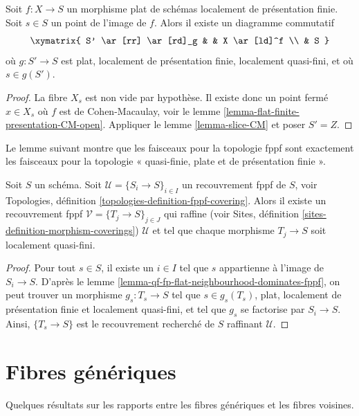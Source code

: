 \begin{lemma}
\label{lemma-qf-fp-flat-neighbourhood-dominates-fppf}
Soit $f : X \to S$ un morphisme plat de schémas
localement de présentation finie. Soit $s \in S$ un point de l'image de $f$.
Alors il existe un diagramme commutatif
$$
\xymatrix{
S' \ar[rr] \ar[rd]_g & & X \ar[ld]^f \\
& S
}
$$
où $g : S' \to S$ est plat, localement de présentation finie,
localement quasi-fini, et où $s \in g(S')$.
\end{lemma}

\begin{proof}
La fibre $X_s$ est non vide par hypothèse. Il existe donc un point
fermé $x \in X_s$ où $f$ est de Cohen-Macaulay, voir le
lemme \ref{lemma-flat-finite-presentation-CM-open}.
Appliquer le
lemme \ref{lemma-slice-CM}
et poser $S' = Z$.
\end{proof}

\noindent
Le lemme suivant montre que les faisceaux pour la topologie fppf
sont exactement les faisceaux pour la topologie
« quasi-finie, plate et de présentation finie ».

\begin{lemma}
\label{lemma-qf-fp-flat-dominates-fppf}
Soit $S$ un schéma. Soit $\mathcal{U} = \{S_i \to S\}_{i \in I}$ un recouvrement
fppf de $S$, voir
Topologies, définition \ref{topologies-definition-fppf-covering}.
Alors il existe un recouvrement fppf $\mathcal{V} = \{T_j \to S\}_{j \in J}$
qui raffine (voir
Sites, définition \ref{sites-definition-morphism-coverings})
$\mathcal{U}$ et tel que chaque morphisme $T_j \to S$ soit localement quasi-fini.
\end{lemma}

\begin{proof}
Pour tout $s \in S$, il existe un $i \in I$ tel que $s$ appartienne à
l'image de $S_i \to S$. D'après le
lemme \ref{lemma-qf-fp-flat-neighbourhood-dominates-fppf},
on peut trouver un morphisme $g_s : T_s \to S$ tel que $s \in g_s(T_s)$,
plat, localement de présentation finie et localement quasi-fini,
et tel que $g_s$ se factorise par $S_i \to S$. Ainsi,
$\{T_s \to S\}$ est le recouvrement recherché de $S$ raffinant $\mathcal{U}$.
\end{proof}

\section{Fibres génériques}
\label{section-generic}

\noindent
Quelques résultats sur les rapports entre les fibres génériques et les
fibres voisines.

